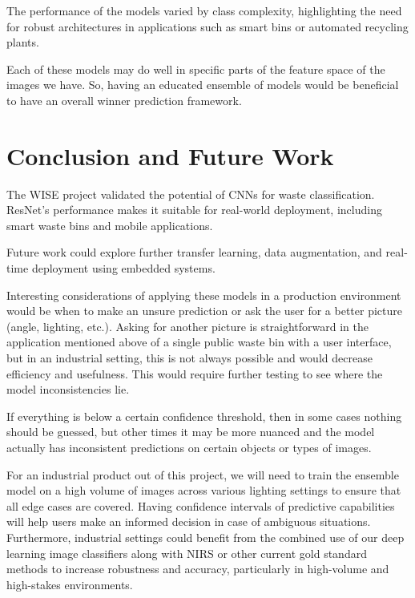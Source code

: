 \documentclass[11pt,twocolumn]{article}
\begin{document}
The performance of the models varied by class complexity, highlighting the need for robust architectures in applications such as smart bins or automated recycling plants.
\vspace{0.2cm}

Each of these models may do well in specific parts of the feature space of the images we have. So, having an educated ensemble of models would be beneficial to have an overall winner prediction framework. 

\section{Conclusion and Future Work}
\label{sec:conclusion}
The WISE project validated the potential of CNNs for waste classification. ResNet’s performance makes it suitable for real-world deployment, including smart waste bins and mobile applications. 

Future work could explore further transfer learning, data augmentation, and real-time deployment using embedded systems.

Interesting considerations of applying these models in a production environment would be when to make an unsure prediction or ask the user for a better picture (angle, lighting, etc.). Asking for another picture is straightforward in the application mentioned above of a single public waste bin with a user interface, but in an industrial setting, this is not always possible and would decrease efficiency and usefulness. This would require further testing to see where the model inconsistencies lie. 
\vspace{0.2cm}

If everything is below a certain confidence threshold, then in some cases nothing should be guessed, but other times it may be more nuanced and the model actually has inconsistent predictions on certain objects or types of images. 

For an industrial product out of this project, we will need to train the ensemble model on a high volume of images across various lighting settings to ensure that all edge cases are covered. Having confidence intervals of predictive capabilities will help users make an informed decision in case of ambiguous situations. Furthermore, industrial settings could benefit from the combined use of our deep learning image classifiers along with NIRS or other current gold standard methods to increase robustness and accuracy, particularly in high-volume and high-stakes environments.
\vspace{0.2cm}
\end{document}

